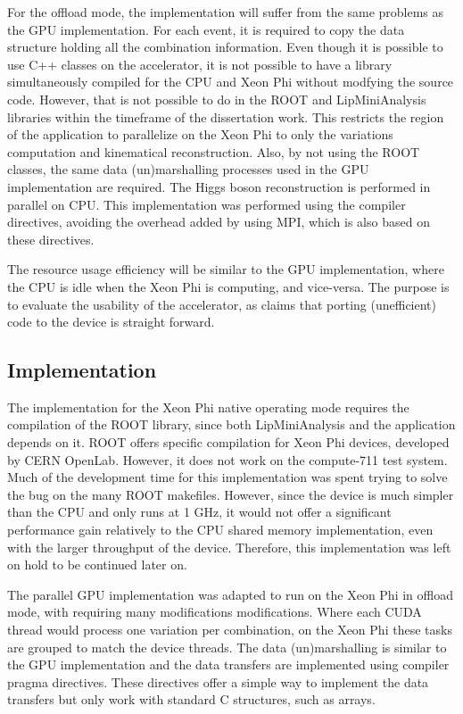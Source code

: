 For the offload mode, the implementation will suffer from the same problems as the GPU implementation. For each event, it is required to copy the data structure holding all the combination information. Even though it is possible to use C++ classes on the accelerator, it is not possible to have a library simultaneously compiled for the CPU and Xeon Phi without modfying the source code. However, that is not possible to do in the ROOT and LipMiniAnalysis libraries within the timeframe of the dissertation work. This restricts the region of the application to parallelize on the Xeon Phi to only the variations computation and kinematical reconstruction. Also, by not using the ROOT classes, the same data (un)marshalling processes used in the GPU implementation are required. The Higgs boson reconstruction is performed in parallel on CPU. This implementation was performed using the \intel compiler directives, avoiding the overhead added by using MPI, which is also based on these directives.

The resource usage efficiency will be similar to the GPU implementation, where the CPU is idle when the Xeon Phi is computing, and vice-versa. The purpose is to evaluate the usability of the accelerator, as \intel claims that porting (unefficient) code to the device is straight forward.

\subsection{Implementation}
\label{MICImplementation}

The implementation for the Xeon Phi native operating mode requires the compilation of the ROOT library, since both LipMiniAnalysis and the application depends on it. ROOT offers specific compilation for \intel Xeon Phi devices, developed by CERN OpenLab. However, it does not work on the compute-711 test system. Much of the development time for this implementation was spent trying to solve the bug on the many ROOT makefiles. However, since the device is much simpler than the CPU and only runs at 1 GHz, it would not offer a significant performance gain relatively to the CPU shared memory implementation, even with the larger throughput of the device. Therefore, this implementation was left on hold to be continued later on.

The parallel GPU implementation was adapted to run on the Xeon Phi in offload mode, with requiring many modifications modifications. Where each CUDA thread would process one variation per combination, on the Xeon Phi these tasks are grouped to match the device threads. The data (un)marshalling is similar to the GPU implementation and the data transfers are implemented using compiler pragma directives. These directives offer a simple way to implement the data transfers but only work with standard C structures, such as arrays.

